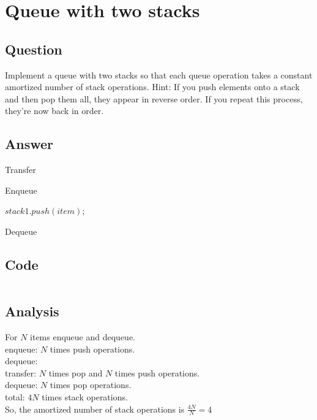 \section{Queue with two stacks}

\subsection*{Question}
Implement a queue with two stacks so that each queue
operation takes a constant amortized number of stack operations. Hint: If you push
elements onto a stack and then pop them all, they appear in reverse order. If you repeat
this process, they’re now back in order.

\subsection*{Answer}
\begin{algorithm}
    \caption{Transfer}
\end{algorithm}

\begin{algorithm}
    \caption{Enqueue}
    $stack1.push(item)$;
\end{algorithm}

\begin{algorithm}
    \caption{Dequeue}
\end{algorithm}

\subsection*{Code}
\inputminted{java}{puzzles/queue_with_two_stacks/QueueWithTwoStacks.java}

\subsection*{Analysis}
For $N$ items enqueue and dequeue.\\
enqueue: $N$ times push operations.\\
dequeue:\\
\indent transfer: $N$ times pop and $N$ times push  operations.\\
\indent dequeue: $N$ times pop operations.\\
total: $4N$ times stack operations.\\
So, the amortized number of stack operations is $\frac{4N}{N}=4$
